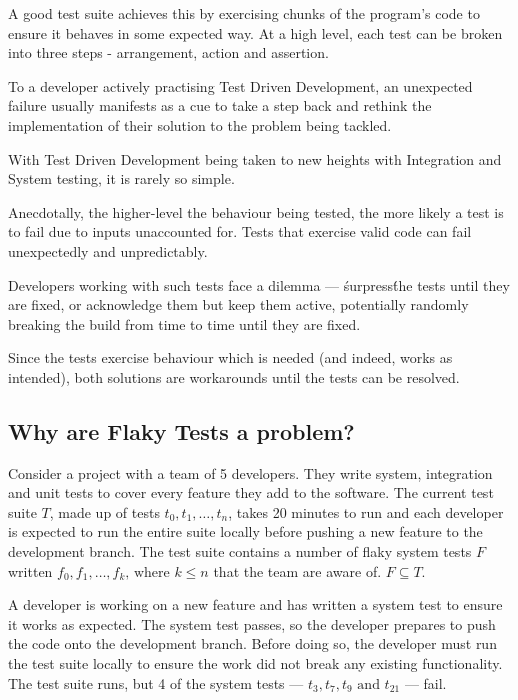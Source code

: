 A good test suite achieves this by exercising chunks of the program's code to ensure it behaves in some expected way. At a high level, each test can be broken into three steps - arrangement, action and assertion.

To a developer actively practising Test Driven Development, an unexpected failure usually manifests as a cue to take a step back and rethink the implementation of their solution to the problem being tackled.

With Test Driven Development being taken to new heights with Integration and System testing, it is rarely so simple.

Anecdotally, the higher-level the behaviour being tested, the more likely a test is to fail due to inputs unaccounted for. Tests that exercise valid code can fail unexpectedly and unpredictably.

Developers working with such tests face a dilemma --- \'surpress\' the tests until they are fixed, or acknowledge them but keep them active, potentially randomly breaking the build from time to time until they are fixed.

Since the tests exercise behaviour which is needed (and indeed, works as intended), both solutions are workarounds until the tests can be resolved.

\subsection{Why are Flaky Tests a problem?}

Consider a project with a team of 5 developers. They write system, integration and unit tests to cover every feature they add to the software. The current test suite $T$, made up of tests $t_{0}, t_{1}, \dots, t_{n}$, takes 20 minutes to run and each developer is expected to run the entire suite locally before pushing a new feature to the development branch. The test suite contains a number of flaky system tests $F$ written $f_{0}, f_{1}, \dots, f_{k} \text{, where $k \leq n$}$ that the team are aware of. $F \subseteq T$.

A developer is working on a new feature and has written a system test to ensure it works as expected. The system test passes, so the developer prepares to push the code onto the development branch. Before doing so, the developer must run the test suite locally to ensure the work did not break any existing functionality. The test suite runs, but 4 of the system tests --- $t_{3}, t_{7}, t_{9} \text{ and } t_{21}$ --- fail.


